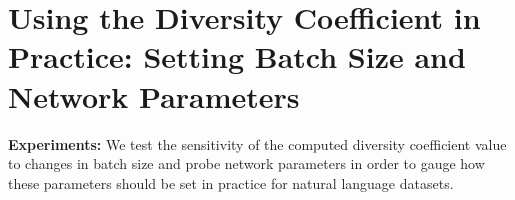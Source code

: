 \documentclass[10pt]{article} %
\begin{document}

\section{Using the Diversity Coefficient in Practice: Setting Batch Size and Network Parameters}
\label{body:div_parameters}
\textbf{Experiments:}
We test the sensitivity of the computed diversity coefficient value to changes in batch size and probe network parameters in order to gauge how these parameters should be set in practice for natural language datasets. 
\end{document}
